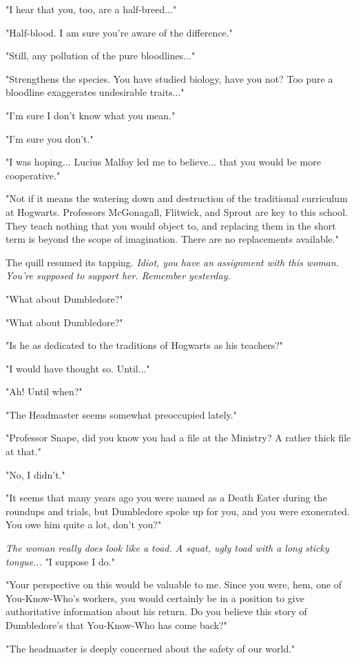 \documentclass[a4paper,11pt]{article}
\begin{document}
"I hear that you, too, are a half-breed..."

"Half-blood. I am sure you're aware of the difference."

"Still, any pollution of the pure bloodlines..."

"Strengthens the species. You have studied biology, have you not? Too pure a bloodline exaggerates undesirable traits..."

"I'm sure I don't know what you mean."

"I'm sure you don't."

"I was hoping... Lucius Malfoy led me to believe... that you would be more cooperative."

"Not if it means the watering down and destruction of the traditional curriculum at Hogwarts. Professors McGonagall, Flitwick, and Sprout are key to this school. They teach nothing that you would object to, and replacing them in the short term is beyond the scope of imagination. There are no replacements available."

The quill resumed its tapping. \emph{Idiot, you have an assignment with this woman. You're supposed to support her. Remember yesterday.}

"What about Dumbledore?"

"What about Dumbledore?"

"Is he as dedicated to the traditions of Hogwarts as his teachers?"

"I would have thought so. Until..."

"Ah! Until when?"

"The Headmaster seems somewhat preoccupied lately."

"Professor Snape, did you know you had a file at the Ministry? A rather thick file at that."

"No, I didn't."

"It seems that many years ago you were named as a Death Eater during the roundups and trials, but Dumbledore spoke up for you, and you were exonerated. You owe him quite a lot, don't you?"

\emph{The woman really does look like a toad. A squat, ugly toad with a long sticky tongue...} "I suppose I do."

"Your perspective on this would be valuable to me. Since you were, hem, one of You-Know-Who's workers, you would certainly be in a position to give authoritative information about his return. Do you believe this story of Dumbledore's that You-Know-Who has come back?"

"The headmaster is deeply concerned about the safety of our world."
\end{document}
